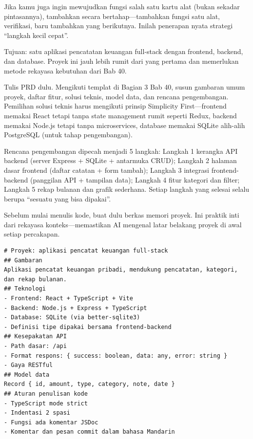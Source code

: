 Jika kamu juga ingin mewujudkan fungsi salah satu kartu alat (bukan sekadar pintasannya), tambahkan secara bertahap—tambahkan fungsi satu alat, verifikasi, baru tambahkan yang berikutnya. Inilah penerapan nyata strategi “langkah kecil cepat”.



Tujuan: satu aplikasi pencatatan keuangan full-stack dengan frontend, backend, dan database. Proyek ini jauh lebih rumit dari yang pertama dan memerlukan metode rekayasa kebutuhan dari Bab 40.

Tulis PRD dulu. Mengikuti templat di Bagian 3 Bab 40, susun gambaran umum proyek, daftar fitur, solusi teknis, model data, dan rencana pengembangan. Pemilihan solusi teknis harus mengikuti prinsip Simplicity First—frontend memakai React tetapi tanpa state management rumit seperti Redux, backend memakai Node.js tetapi tanpa microservices, database memakai SQLite alih-alih PostgreSQL (untuk tahap pengembangan).

Rencana pengembangan dipecah menjadi 5 langkah: Langkah 1 kerangka API backend (server Express + SQLite + antarmuka CRUD); Langkah 2 halaman dasar frontend (daftar catatan + form tambah); Langkah 3 integrasi frontend-backend (panggilan API + tampilan data); Langkah 4 fitur kategori dan filter; Langkah 5 rekap bulanan dan grafik sederhana. Setiap langkah yang selesai selalu berupa “sesuatu yang bisa dipakai”.


Sebelum mulai menulis kode, buat dulu berkas memori proyek. Ini praktik inti dari rekayasa konteks—memastikan AI mengenal latar belakang proyek di awal setiap percakapan.

\begin{lstlisting}
# Proyek: aplikasi pencatat keuangan full-stack
## Gambaran
Aplikasi pencatat keuangan pribadi, mendukung pencatatan, kategori, dan rekap bulanan.
## Teknologi
- Frontend: React + TypeScript + Vite
- Backend: Node.js + Express + TypeScript
- Database: SQLite (via better-sqlite3)
- Definisi tipe dipakai bersama frontend-backend
## Kesepakatan API
- Path dasar: /api
- Format respons: { success: boolean, data: any, error: string }
- Gaya RESTful
## Model data
Record { id, amount, type, category, note, date }
## Aturan penulisan kode
- TypeScript mode strict
- Indentasi 2 spasi
- Fungsi ada komentar JSDoc
- Komentar dan pesan commit dalam bahasa Mandarin
\end{lstlisting}

